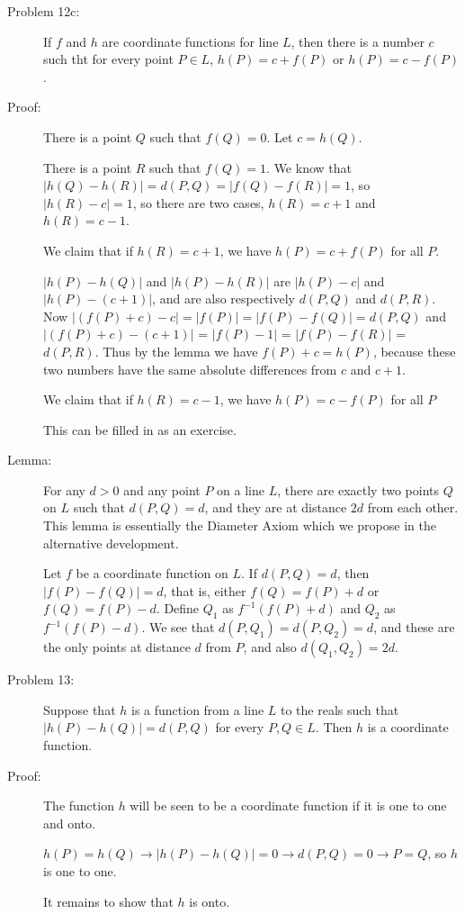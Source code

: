 \documentclass[12pt]{article}
\begin{document}
\begin{description}
\item[Problem 12c:]  If $f$ and $h$ are coordinate functions for line $L$, then there is a number $c$ such tht for every point $P \in L$, $h(P) = c+f(P)$ or $h(P) = c-f(P)$.

\item[Proof:]  There is a point $Q$ such that $f(Q) = 0$.  Let $c=h(Q)$.

There is a point $R$ such that $f(Q)=1$.  We know that $|h(Q)-h(R)| = d(P,Q) = |f(Q)-f(R)| = 1$, so $|h(R)-c|=1$, so there are two cases, $h(R)=c+1$ and $h(R)=c-1$.

We claim that if $h(R)=c+1$, we have $h(P) = c+f(P)$ for all $P$.

$|h(P)-h(Q)|$ and $|h(P)-h(R)|$ are $|h(P)-c|$ and $|h(P)-(c+1)|$, and are also respectively $d(P,Q)$ and $d(P,R)$.  Now $|(f(P)+c)-c| = |f(P)| = |f(P)-f(Q)| = d(P,Q)$ and $|(f(P)+c)-(c+1)|$ = $|f(P)-1|$ = $|f(P)-f(R)|$ = $d(P,R)$.
Thus by the lemma we have $f(P)+c = h(P)$,  because these two numbers have the same absolute differences from $c$ and $c+1$.

We claim that if $h(R)=c-1$, we have $h(P) = c-f(P)$ for all $P$

This can be filled in as an exercise.


\item[Lemma:]  For any $d>0$ and any point $P$ on a line $L$, there are exactly two points $Q$  on $L$ such that $d(P,Q)=d$, and they are at distance $2d$ from each other.  This lemma is essentially the Diameter Axiom which we propose in the alternative development.

Let $f$ be a coordinate function on $L$.  If $d(P,Q)= d$, then $|f(P)-f(Q)|=d$, that is, either $f(Q) = f(P)+d$ or $f(Q) = f(P)-d$.
Define $Q_1$ as $f^{-1}(f(P)+d)$ and $Q_2$ as $f^{-1}(f(P)-d)$.  We see that $d(P,Q_1)=d(P,Q_2)=d$, and these are the only points at distance $d$
from $P$, and also $d(Q_1,Q_2)=2d$.

\item[Problem 13:]  Suppose that $h$ is a function from a line $L$ to the reals such that $|h(P)-h(Q)| = d(P,Q)$ for every $P,Q \in L$.  Then $h$ is a coordinate function.

\item[Proof:]  The function $h$ will be seen to be a coordinate function if it is one to one and onto.

$h(P) = h(Q) \rightarrow |h(P)-h(Q)|=0 \rightarrow d(P,Q)=0 \rightarrow P=Q$, so $h$ is one to one.

It remains to show that $h$ is onto. 


\end{description}
\end{document}
